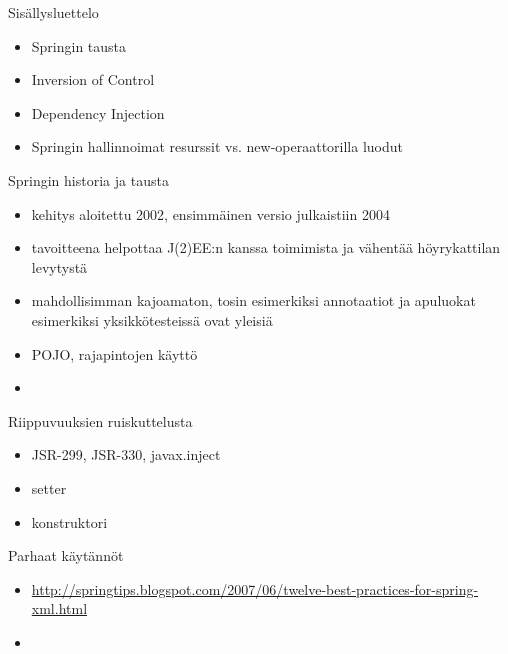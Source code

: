 \documentclass[hyperref={pdfauthor=\AUTHOR},14pt]{beamer}
\author{\AUTHOR}
\title[\TITLE]{\TITLE}
\date{\DATE}
\begin{document}
\begin{frame}[plain]
\titlepage
\end{frame}

\begin{frame}[t, fragile]{Sisällysluettelo}
\begin{itemize}
\item Springin tausta
\item Inversion of Control
\item Dependency Injection
\item Springin hallinnoimat resurssit vs. new-operaattorilla luodut
\end{itemize}
\end{frame}

\begin{frame}{Springin historia ja tausta}
\begin{itemize}
\item kehitys aloitettu 2002, ensimmäinen versio julkaistiin 2004
\item tavoitteena helpottaa J(2)EE:n kanssa toimimista ja vähentää
  höyrykattilan levytystä
\item mahdollisimman kajoamaton, tosin esimerkiksi annotaatiot ja
  apuluokat esimerkiksi yksikkötesteissä ovat yleisiä
\item POJO, rajapintojen käyttö
\item 
\end{itemize}
\end{frame}

\begin{frame}{Riippuvuuksien ruiskuttelusta}
\begin{itemize}
\item JSR-299, JSR-330, javax.inject
\item setter
\item konstruktori

\end{itemize}
\end{frame}

\begin{frame}{Parhaat käytännöt}
\begin{itemize}
\item \url{http://springtips.blogspot.com/2007/06/twelve-best-practices-for-spring-xml.html}
\end{itemize}
\end{frame}

\begin{frame}{}
\begin{itemize}
\item 
\end{itemize}
\end{frame}
\end{document}
